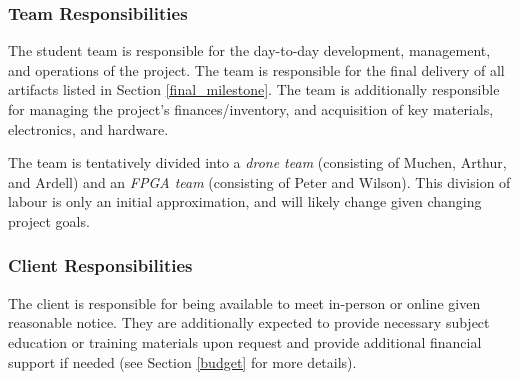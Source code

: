\subsubsection{Team Responsibilities}
The student team is responsible for the day-to-day development, management, and
operations of the project. The
team is responsible for the final delivery of all artifacts listed in Section
\ref{final_milestone}.
The team is additionally responsible for managing the project's finances/inventory,
and acquisition of key materials, electronics, and hardware.

The team is tentatively divided into a \textit{drone team} (consisting of Muchen, Arthur, and Ardell) and an \textit{FPGA team} (consisting of Peter and Wilson). This division of labour is only an initial approximation, and will likely change given changing project goals.

\subsubsection{Client Responsibilities}
The client is responsible for being available to meet in-person or online
given reasonable notice. They are additionally expected to provide necessary subject education or training materials upon request and provide additional financial support if needed (see Section \ref{budget} for
more details).
